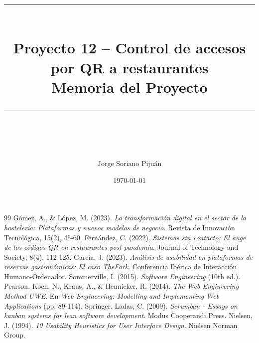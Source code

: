 \documentclass[12pt,a4paper]{article}
\title{
    \vspace{-2cm}
    \rule{\linewidth}{0.5mm} \\[0.4cm]
    \LARGE \bfseries Proyecto 12 -- Control de accesos por QR a restaurantes \\[0.2cm]
    \large Memoria del Proyecto \\[0.4cm]
    \rule{\linewidth}{0.5mm} \\[1cm]
}
\author{\Large Jorge Soriano Pijuán}
\date{\today}
\begin{document}
\maketitle
\thispagestyle{empty}
\newpage

\tableofcontents
\newpage


\newpage


\newpage


\newpage


\newpage



\begin{thebibliography}{99}
 Gómez, A., \& López, M. (2023). \textit{La transformación digital en el sector de la hostelería: Plataformas y nuevos modelos de negocio}. Revista de Innovación Tecnológica, 15(2), 45-60.
 Fernández, C. (2022). \textit{Sistemas sin contacto: El auge de los códigos QR en restaurantes post-pandemia}. Journal of Technology and Society, 8(4), 112-125.
 García, J. (2023). \textit{Análisis de usabilidad en plataformas de reservas gastronómicas: El caso TheFork}. Conferencia Ibérica de Interacción Humano-Ordenador.
 Sommerville, I. (2015). \textit{Software Engineering} (10th ed.). Pearson.
 Koch, N., Kraus, A., \& Hennicker, R. (2014). \textit{The Web Engineering Method UWE}. En \textit{Web Engineering: Modelling and Implementing Web Applications} (pp. 89-114). Springer.
 Ladas, C. (2009). \textit{Scrumban - Essays on kanban systems for lean software development}. Modus Cooperandi Press.
 Nielsen, J. (1994). \textit{10 Usability Heuristics for User Interface Design}. Nielsen Norman Group.
\end{thebibliography}
\end{document}
